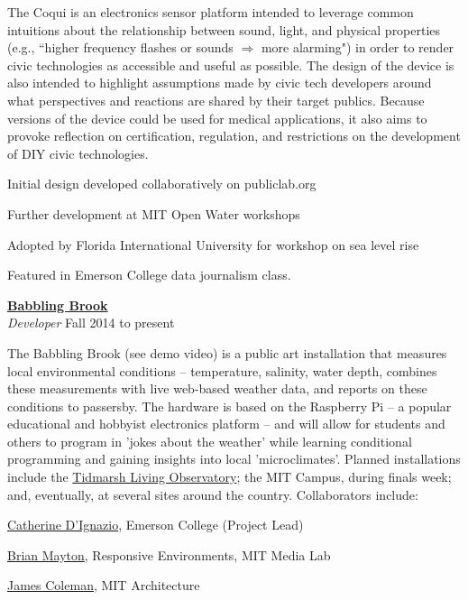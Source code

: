 \documentclass[10pt]{article}
\newcommand{\blankline}{\quad\pagebreak[3]}
\newcommand{\halfblankline}{\quad\vspace{-0.5\baselineskip}\pagebreak[3]}
\begin{document}
The Coqui is an electronics sensor platform intended to leverage common intuitions about the relationship between sound, light, and physical properties (e.g., ``higher frequency flashes or sounds $\Rightarrow$ more alarming") in order to render civic technologies as accessible and useful as possible. The design of the device is also intended to highlight assumptions made by civic tech developers around what perspectives and reactions are shared by their target publics.  Because versions of the device could be used for medical applications, it also aims to provoke reflection on certification, regulation, and restrictions on the development of DIY civic technologies.
    \begin{innerlist}
        \item Initial design developed collaboratively on publiclab.org
\item Further development at MIT Open Water workshops
\item Adopted by Florida International University for workshop on sea level rise
        \item Featured in Emerson College data journalism class.
\end{innerlist}

\blankline


\href{http://www.slideshare.net/CatherineDIgnazio/sensing-nature-the-babbling-brook}{\textbf{Babbling Brook}} \\
\emph{Developer} \hfill {Fall 2014 to present} 

\halfblankline

The Babbling Brook (see demo video) is a public art installation that measures local environmental conditions -- temperature, salinity, water depth, combines these measurements with live web-based weather data, and reports on these conditions to passersby.  The hardware is based on the Raspberry Pi -- a popular educational and hobbyist electronics platform -- and will allow for students and others to program in 'jokes about the weather' while learning conditional programming and gaining insights into local 'microclimates'.  Planned installations include the \href{http://tidmarsh.media.mit.edu/}{Tidmarsh Living Observatory}; the MIT Campus, during finals week; and, eventually, at several sites around the country.  Collaborators include: 

\begin{innerlist}
        \item \href{https://civic.mit.edu/users/kanarinka}{Catherine D'Ignazio}, Emerson College (Project Lead)
\item \href{http://bdm.cc/}{Brian Mayton}, Responsive Environments, MIT Media Lab
\item \href{http://parapractice.net/about-2/about-me-example/}{James Coleman}, MIT Architecture
\end{innerlist}
\end{document}
